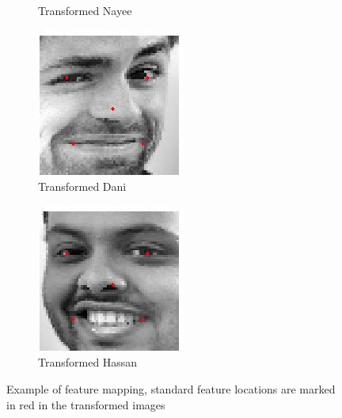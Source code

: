 \documentclass[12pt,a4paper,titlepage]{article}
\begin{document}
\begin{figure}[H]
\begin{subfigure}{0.3\textwidth}
		\caption{Transformed Nayee}
	\end{subfigure}	
	\quad
	\begin{subfigure}{0.3\columnwidth}
		\centering
		\includegraphics[width=\textwidth]{mapping4.jpg}
		\caption{Transformed Dani}
	\end{subfigure}
	\quad
	\begin{subfigure}{0.3\textwidth}
		\centering
		\includegraphics[width=\textwidth]{mapping6.jpg}
		\caption{Transformed Hassan}
	\end{subfigure}	
	\caption{Example of feature mapping, standard feature locations are marked in red in the transformed images}
\end{figure}
\end{document}
